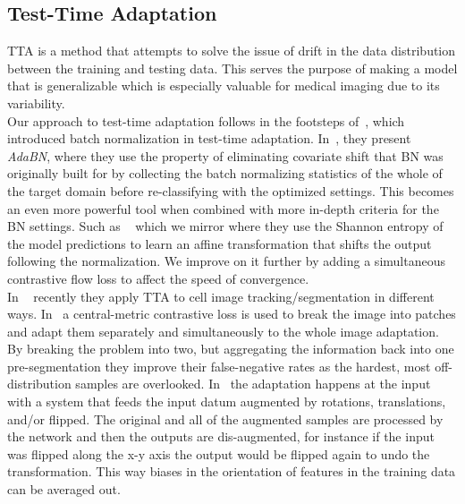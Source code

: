 \subsection{Test-Time Adaptation}
\label{sec:TTARW}

TTA is a method that attempts to solve the issue of drift in the data distribution between the training and testing data. This serves the purpose of making a model that is generalizable which is especially valuable for medical imaging due to its variability. 
\\

Our approach to test-time adaptation follows in the footsteps of~\cite{Li2018-el}, which introduced batch normalization in test-time adaptation. In~\cite{Li2018-el}, they present \textit{AdaBN}, where they use the property of eliminating covariate shift that BN was originally built for by collecting the batch normalizing statistics of the whole of the target domain before re-classifying with the optimized settings.  This becomes an even more powerful tool when combined with more in-depth criteria for the BN settings.  Such as ~\cite{wang2020tent} which we mirror where they use the Shannon entropy of the model predictions to learn an affine transformation that shifts the output following the normalization.  We improve on it further by adding a simultaneous contrastive flow loss to affect the speed of convergence.\\

In ~\cite{chen2024cmtt,Moshkov2020-uy} recently they apply TTA to cell image tracking/segmentation in different ways.  In~\cite{chen2024cmtt} a central-metric contrastive loss is used to break the image into patches and adapt them separately and simultaneously to the whole image adaptation.  By breaking the problem into two, but aggregating the information back into one pre-segmentation they improve their false-negative rates as the hardest, most off-distribution samples are overlooked.   In~\cite{Moshkov2020-uy} the adaptation happens at the input with a system that feeds the input datum augmented by rotations, translations, and/or flipped.  The original and all of the augmented samples are processed by the network and then the outputs are dis-augmented, for instance if the input was flipped along the x-y axis the output would be flipped again to undo the transformation.  This way biases in the orientation of features in the training data can be averaged out.  




